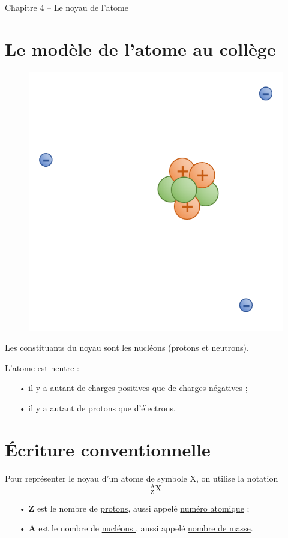 \documentclass[12pt,a4paper]{article}
\begin{document}
\begin{header}
Chapitre 4 -- Le noyau de l'atome
\end{header}


\section{Le modèle de l'atome au collège}

\begin{figure}[h]
\center
\includegraphics[scale=0.85]{images/atome.png}
\end{figure}

Les constituants du noyau sont les nucléons (protons et neutrons).

L'atome est neutre :
\begin{itemize}
\item[•] il y a autant de charges positives que de charges négatives ;
\item[•] il y a autant de protons que d'électrons.
\end{itemize}

\section{Écriture conventionnelle}

\begin{definition}
Pour représenter le noyau d'un atome de symbole X, on utilise la notation
{\Huge \bf
\[
^\text{A} _\text{Z} \text{X}
\]
}
\begin{itemize}
\item[•] \textbf{Z} est le nombre de \underline{protons}, aussi appelé \underline{numéro atomique} ;
\item[•] \textbf{A} est le nombre de \underline{nucléons }, aussi appelé \underline{nombre de masse}.
\end{itemize}
\end{definition}
\end{document}
